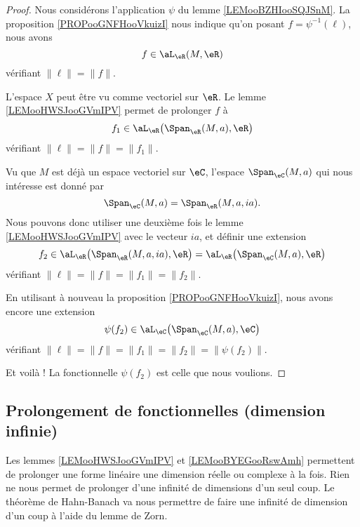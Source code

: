 \begin{proof}
	Nous considérons l'application \( \psi\) du lemme \ref{LEMooBZHIooSQJSnM}. La proposition \ref{PROPooGNFHooVkuizI} nous indique qu'on posant \( f=\psi^{-1}(\ell)\), nous avons
	\begin{equation}
		f\in\aL_{\eR}(M,\eR)
	\end{equation}
	vérifiant \( \| \ell \|=\| f \|\).

	L'espace \( X\) peut être vu comme vectoriel sur \( \eR\). Le lemme \ref{LEMooHWSJooGVmIPV} permet de prolonger \( f\) à
	\begin{equation}
		f_1\in\aL_{\eR}\big( \Span_{\eR}(M,a),\eR \big)
	\end{equation}
	vérifiant \( \| \ell \|=\| f \|=\| f_1 \|\).

	Vu que \( M\) est déjà un espace vectoriel sur \( \eC\), l'espace \( \Span_{\eC}(M,a)\) qui nous intéresse est donné par
	\begin{equation}
		\Span_{\eC}(M,a)=\Span_{\eR}(M,a,ia).
	\end{equation}
	Nous pouvons donc utiliser une deuxième fois le lemme \ref{LEMooHWSJooGVmIPV} avec le vecteur \( ia\), et définir une extension
	\begin{equation}
		f_2\in\aL_{\eR}\big( \Span_{\eR}(M,a,ia),\eR \big)=\aL_{\eR}\big( \Span_{\eC}(M,a),\eR \big)
	\end{equation}
	vérifiant \( \| \ell \|=\| f \|=\| f_1 \|=\| f_2 \|\).

	En utilisant à nouveau la proposition \ref{PROPooGNFHooVkuizI}, nous avons encore une extension
	\begin{equation}
		\psi(f_2)\in\aL_{\eC}\big( \Span_{\eC}(M,a),\eC \big)
	\end{equation}
	vérifiant \( \| \ell \|=\| f \|=\| f_1 \|=\| f_2 \|=\| \psi(f_2) \|\).

	Et voilà ! La fonctionnelle \( \psi(f_2)\) est celle que nous voulions.
\end{proof}

\subsection{Prolongement de fonctionnelles (dimension infinie)}

Les lemmes \ref{LEMooHWSJooGVmIPV} et \ref{LEMooBYEGooRswAmh} permettent de prolonger une forme linéaire une dimension réelle ou complexe à la fois. Rien ne nous permet de prolonger d'une infinité de dimensions d'un seul coup. Le théorème de Hahn-Banach va nous permettre de faire une infinité de dimension d'un coup à l'aide du lemme de Zorn.

